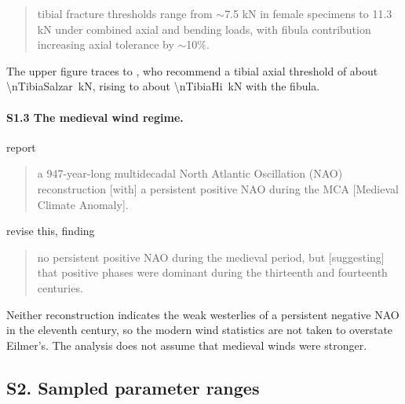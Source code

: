 \begin{quote}\small
tibial fracture thresholds range from \(\sim\)7.5 kN in female specimens to 11.3 kN
under combined axial and bending loads, with fibula contribution increasing axial
tolerance by \(\sim\)10\%.
\end{quote}

\noindent The upper figure traces to \textcite{salzar2014leg}, who recommend a tibial axial
threshold of about \SI{\nTibiaSalzar}{\kilo\newton}, rising to about \SI{\nTibiaHi}{\kilo\newton} with
the fibula.

\paragraph{S1.3 The medieval wind regime.}
\textcite{trouet2009nao} report

\begin{quote}\small
a 947-year-long multidecadal North Atlantic Oscillation (NAO) reconstruction [with]
a persistent positive NAO during the MCA [Medieval Climate Anomaly].
\end{quote}

\noindent \textcite{ortega2015nao} revise this, finding

\begin{quote}\small
no persistent positive NAO during the medieval period, but [suggesting] that
positive phases were dominant during the thirteenth and fourteenth centuries.
\end{quote}

\noindent Neither reconstruction indicates the weak westerlies of a persistent negative NAO
in the eleventh century, so the modern wind statistics are not taken to overstate
Eilmer's.
The analysis does not assume that medieval winds were stronger.

\subsection*{S2. Sampled parameter ranges}

